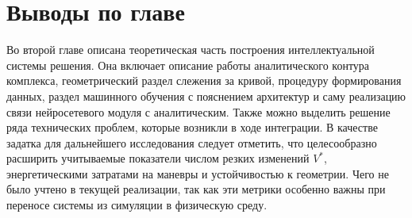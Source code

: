 \section{Выводы по главе}

Во второй главе описана теоретическая часть построения интеллектуальной системы решения.
Она включает описание работы аналитического контура комплекса, геометрический раздел слежения за кривой, процедуру формирования данных, раздел машинного обучения с пояснением архитектур и саму реализацию связи нейросетевого модуля с аналитическим.
Также можно выделить решение ряда технических проблем, которые возникли в ходе интеграции.
В качестве задатка для дальнейшего исследования следует отметить, что целесообразно расширить учитываемые показатели числом резких изменений $V^\ast$, энергетическими затратами на маневры и устойчивостью к геометрии.
Чего не было учтено в текущей реализации, так как эти метрики особенно важны при переносе системы из симуляции в физическую среду.